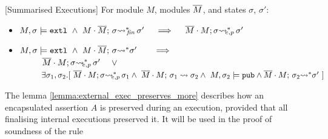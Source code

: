  
 \begin{auxLemma}
\label{lemma:external_breakdown:term}[Summarised Executions]
For   module $M$, modules $\overline{M}$, and states $\sigma$, $\sigma'$:
\\
\begin{itemize}
\item
$M,\sigma \models \extThis\ \wedge \ \leadstoBoundedStarFin {M\cdot \Mtwo}  {\sigma}  {\sigma'}  \ \ \  \ 
\Longrightarrow \ \ \  \ \leadstoBoundedExtPub {\Mtwo\cdot M}    {\sigma}  {\sigma'}$
\item
$M,\sigma \models \extThis\ \wedge \ \leadstoBoundedStar  {M\cdot \Mtwo}  {\sigma}  {\sigma'}  \ \ \  \ \ \  
\Longrightarrow$\\
$\strut \ \ \ \ \ \ \ \    \leadstoBoundedExtPub {\Mtwo\cdot M}    {\sigma}  {\sigma'}\ \ \ \  \vee$\\
$\strut \ \ \ \ \ \ \ \    \exists \sigma_1,\sigma_2.[\ 
\leadstoBoundedExtPub {\Mtwo\cdot M}    {\sigma}  {\sigma_1} 
\wedge\ \leadstoBounded  {\Mtwo\cdot M}    {\sigma_1}  {\sigma_2} 
\wedge \ M, \sigma_2 \models \pubMeth \wedge \leadstoBoundedStar  {\Mtwo\cdot M}    {\sigma_2}  {\sigma'} \ ]
$
\end{itemize}
\end{auxLemma}
 


The lemma  \ref{lemma:external_exec_preserves_more} describes how an encapsulated assertion $A$ is preserved during an execution, 
provided that all finalising internal executions preserved it. 
It will be used in the proof of soundness of the rule {}



